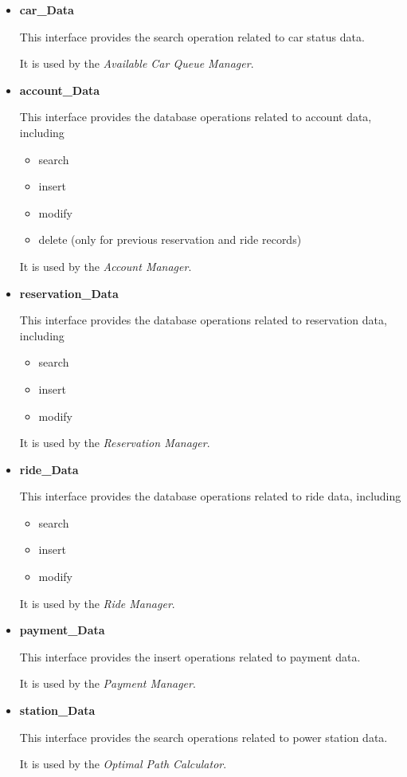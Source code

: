 \documentclass[a4paper,11pt]{article}
\begin{document}
			\begin{itemize}
				\item \textbf{car\_Data}

This interface provides the search operation related to car status data.

It is used by the \textsl{Available Car Queue Manager}.

				\item \textbf{account\_Data}

This interface provides the database operations related to account data, including 
					\begin{itemize}
						\item search
						\item insert
						\item modify
						\item delete (only for previous reservation and ride records)
					\end{itemize}

It is used by the \textsl{Account Manager}.

				\item \textbf{reservation\_Data}

This interface provides the 	database operations related to reservation data, including 
					\begin{itemize}
						\item search
						\item insert
						\item modify
					\end{itemize}		

It is used by the \textsl{Reservation Manager}.
	
				\item \textbf{ride\_Data}

This interface provides the 	database operations related to ride data, including 
					\begin{itemize}
						\item search
						\item insert
						\item modify
					\end{itemize}		

It is used by the \textsl{Ride Manager}.

				\item \textbf{payment\_Data}

This interface provides the 	insert operations related to payment data.

It is used by the \textsl{Payment Manager}.
				
				\item \textbf{station\_Data}

This interface provides the 	search operations related to power station data.

It is used by the \textsl{Optimal Path Calculator}.				
			\end{itemize}
			
\end{document}
